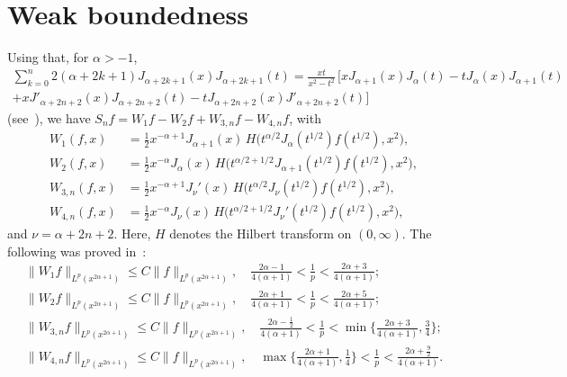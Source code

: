 \documentclass{amsart}
\theoremstyle{plain}
\begin{document}
\section{Weak boundedness}

Using that, for $\alpha >-1$,
\begin{multline*}
   \sum_{k=0}^n 2 (\alpha+2k+1) J_{\alpha+2k+1}(x) J_{\alpha+2k+1}(t)
   = \frac{xt}{x^2-t^2} \, [
   x J_{\alpha+1}(x) J_\alpha(t) - t J_\alpha(x) J_{\alpha+1}(t)
   \\
   + x J'_{\alpha+2n+2}(x) J_{\alpha+2n+2}(t)
   - t J_{\alpha+2n+2}(x) J'_{\alpha+2n+2}(t)
   ]
\end{multline*}
(see~\cite{GPV2, V}), we have
$S_n f = W_1 f - W_2 f + W_{3,n} f - W_{4,n} f$,
with
\begin{align*}
   W_1(f,x) &= \tfrac12 x^{-\alpha+1} J_{\alpha+1}(x)
   \, H\big( t^{\alpha/2} J_{\alpha}(t^{1/2}) f(t^{1/2}), x^2 \big),
   \\
   W_2(f,x) &= \tfrac12 x^{-\alpha} J_{\alpha}(x)
   \, H\big(t^{\alpha/2+1/2} J_{\alpha+1}(t^{1/2}) f(t^{1/2}), x^2 \big),
   \\
   W_{3,n}(f,x) &= \tfrac12 x^{-\alpha+1} J_\nu'(x)
   \, H\big(t^{\alpha/2} J_\nu(t^{1/2}) f(t^{1/2}), x^2 \big),
   \\
   W_{4,n}(f,x) &= \tfrac12 x^{-\alpha} J_\nu(x)
   \, H\big(t^{\alpha/2+1/2} J_\nu'(t^{1/2}) f(t^{1/2}), x^2 \big),
\end{align*}
and $\nu=\alpha+2n+2$. Here, $H$ denotes the Hilbert transform
on $(0,\infty)$.
The following was proved in~\cite[Theorem~1]{GPV2}:
\begin{gather}
\label{ec:acotW1}
   \| W_1 f \|_{L^p(x^{2\alpha+1})} \leq C \| f \|_{L^p(x^{2\alpha+1})},
   \quad
   \frac{2\alpha-1}{4(\alpha+1)} < \frac{1}{p} <
   \frac{2\alpha+3}{4(\alpha+1)};
   \\
\label{ec:acotW2}
   \| W_2 f \|_{L^p(x^{2\alpha+1})} \leq C \| f \|_{L^p(x^{2\alpha+1})},
   \quad
   \frac{2\alpha+1}{4(\alpha+1)} < \frac{1}{p} <
   \frac{2\alpha+5}{4(\alpha+1)};
   \\
\label{ec:acotW3n}
   \| W_{3,n} f \|_{L^p(x^{2\alpha+1})} \leq C \| f \|_{L^p(x^{2\alpha+1})},
   \quad
   \frac{2\alpha-\frac{1}{2}}{4(\alpha+1)} < \frac{1}{p} <
   \min\Big\{\frac{2\alpha+3}{4(\alpha+1)},\frac{3}{4}\Big\};
   \\
\label{ec:acotW4n}
   \| W_{4,n} f \|_{L^p(x^{2\alpha+1})} \leq C \| f \|_{L^p(x^{2\alpha+1})},
   \quad
   \max\Big\{\frac{2\alpha+1}{4(\alpha+1)},\frac{1}{4}\Big\}
   < \frac{1}{p} <
   \frac{2\alpha+\frac{9}{2}}{4(\alpha+1)}.
\end{gather}
\end{document}
